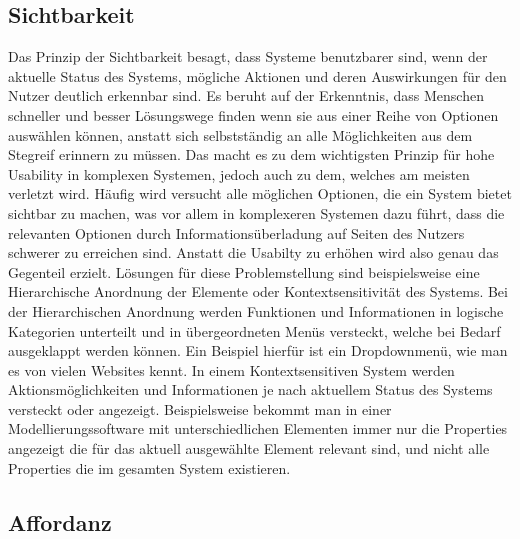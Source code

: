 \subsection*{Sichtbarkeit}

Das Prinzip der Sichtbarkeit besagt, dass Systeme benutzbarer sind, wenn der aktuelle Status des Systems, mögliche Aktionen und deren Auswirkungen für den Nutzer deutlich erkennbar sind.
Es beruht auf der Erkenntnis, dass Menschen schneller und besser Lösungswege finden wenn sie aus einer Reihe von Optionen auswählen können, anstatt sich selbstständig an alle Möglichkeiten aus dem Stegreif erinnern zu müssen\cite{Lidwell.2010}.
Das macht es zu dem wichtigsten Prinzip für hohe Usability in komplexen Systemen, jedoch auch zu dem, welches am meisten verletzt wird\cite{Norman.2016}.
Häufig wird versucht alle möglichen Optionen, die ein System bietet sichtbar zu machen, was vor allem in komplexeren Systemen dazu führt, dass die relevanten Optionen durch Informationsüberladung auf Seiten des Nutzers schwerer zu erreichen sind. 
Anstatt die Usabilty zu erhöhen wird also genau das Gegenteil erzielt.
Lösungen für diese Problemstellung sind beispielsweise eine Hierarchische Anordnung der Elemente oder Kontextsensitivität des Systems.
Bei der Hierarchischen Anordnung werden Funktionen und Informationen in logische Kategorien unterteilt und in übergeordneten Menüs versteckt, welche bei Bedarf ausgeklappt werden können. Ein Beispiel hierfür ist ein Dropdownmenü, wie man es von vielen Websites kennt.
In einem Kontextsensitiven System werden Aktionsmöglichkeiten und Informationen je nach aktuellem Status des Systems versteckt oder angezeigt. Beispielsweise bekommt man in einer Modellierungssoftware mit unterschiedlichen Elementen immer nur die Properties angezeigt die für das aktuell ausgewählte Element relevant sind, und nicht alle Properties die im gesamten System existieren\cite{Lidwell.2010}.


\subsection*{Affordanz}


